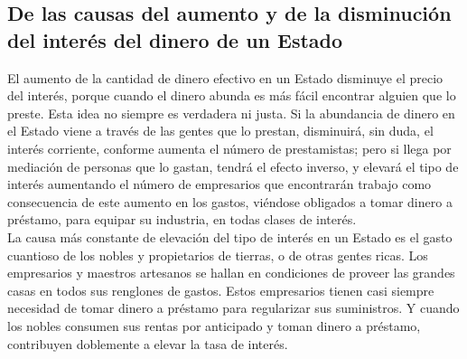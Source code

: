 \documentclass[10pt]{article}
\begin{document}
\begin{multicols}{1}
\section*{De las causas del aumento y de la disminución del interés del dinero de un Estado}
El aumento de la cantidad de dinero efectivo en un Estado disminuye el precio del interés, porque cuando el dinero abunda es más fácil encontrar alguien que lo preste. Esta idea no siempre es verdadera ni justa. Si la abundancia de dinero en el Estado viene a través de las gentes que lo prestan, disminuirá, sin duda, el interés corriente, conforme aumenta el número de prestamistas; pero si llega por mediación de personas que lo gastan, tendrá el efecto inverso, y elevará el tipo de interés aumentando el número de empresarios que encontrarán trabajo como consecuencia de este aumento en los gastos, viéndose obligados a tomar dinero a préstamo, para equipar su industria, en todas clases de interés.\\
La causa más constante de elevación del tipo de interés en un Estado es el gasto cuantioso de los nobles
y propietarios de tierras, o de otras gentes ricas. Los empresarios y maestros artesanos se hallan en condiciones de proveer las grandes casas en todos sus renglones de gastos. Estos empresarios tienen casi siempre necesidad de tomar dinero a préstamo para regularizar sus suministros. Y cuando los nobles consumen sus rentas por anticipado y toman dinero a préstamo, contribuyen doblemente a elevar la tasa de interés.
\end{multicols}
\end{document}
